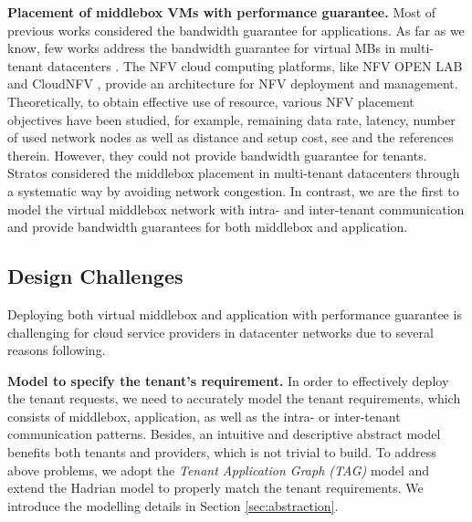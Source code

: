 \documentclass[review]{elsarticle}
\begin{document}
\textbf{Placement of middlebox VMs with performance guarantee.}
Most of previous works considered the bandwidth guarantee for applications. As far as we know, few works address the bandwidth guarantee for virtual MBs in multi-tenant datacenters \cite{nfv_challenges}. The NFV cloud computing platforms, like NFV OPEN LAB \cite{HuaweiNFV} and CloudNFV \cite{CloudNFV}, provide an architecture for NFV deployment and management.
 Theoretically, to obtain effective use of resource, various NFV placement objectives have been studied, for example, remaining data rate, latency, number of used network nodes as well as distance and setup cost, see \cite{M14sap, cohen2015near} and the references therein. However, they could not provide bandwidth guarantee for tenants. Stratos \cite{stratos12} considered the middlebox placement in multi-tenant datacenters through a systematic way by avoiding network congestion. In contrast,
 we are the first to model the virtual middlebox network with intra- and inter-tenant communication and provide bandwidth guarantees for both middlebox and application.
 

\subsection{Design Challenges}

Deploying both virtual middlebox and application with performance guarantee is challenging for cloud service providers in datacenter networks due to several reasons following. 

\textbf{Model to specify the tenant's requirement.}
In order to effectively deploy the tenant requests, we need to accurately model the tenant requirements, which consists of middlebox, application, as well as the intra- or inter-tenant communication patterns. Besides, an intuitive and descriptive abstract model benefits both tenants and providers, which is not trivial to build. To address above problems, we adopt the \emph{Tenant Application Graph (TAG)} \cite{cloudmirror} model and extend the Hadrian \cite{B13cta} model to properly match the tenant requirements. We introduce the modelling details in Section \ref{sec:abstraction}. 
\end{document}
